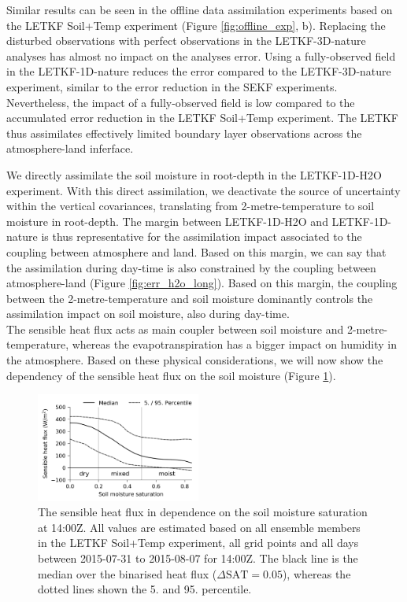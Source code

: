 \documentclass[hess, manuscript]{copernicus}
\begin{document}
Similar results can be seen in the offline data assimilation experiments based on the LETKF Soil+Temp experiment (Figure \ref{fig:offline_exp}, b).
Replacing the disturbed observations with perfect observations in the LETKF-3D-nature analyses has almost no impact on the analyses error.
Using a fully-observed field in the LETKF-1D-nature reduces the error compared to the LETKF-3D-nature experiment, similar to the error reduction in the SEKF experiments.
Nevertheless, the impact of a fully-observed field is low compared to the accumulated error reduction in the LETKF Soil+Temp experiment.
The LETKF thus assimilates effectively limited boundary layer observations across the atmosphere-land inferface.

We directly assimilate the soil moisture in root-depth in the LETKF-1D-H2O experiment.
With this direct assimilation, we deactivate the source of uncertainty within the vertical covariances, translating from 2-metre-temperature to soil moisture in root-depth.
The margin between LETKF-1D-H2O and LETKF-1D-nature is thus representative for the assimilation impact associated to the coupling between atmosphere and land.
Based on this margin, we can say that the assimilation during day-time is also constrained by the coupling between atmosphere-land (Figure \ref{fig:err_h2o_long}).
Based on this margin, the coupling between the 2-metre-temperature and soil moisture dominantly controls the assimilation impact on soil moisture, also during day-time.\\

The sensible heat flux acts as main coupler between soil moisture and 2-metre-temperature, whereas the evapotranspiration has a bigger impact on humidity in the atmosphere.
Based on these physical considerations, we will now show the dependency of the sensible heat flux on the soil moisture (Figure \ref{fig:sensible_smi}).

\begin{figure}[ht]
	\includegraphics[width=0.48\textwidth]{figures/fig_08_sensible_sat.png}
	\caption{
		The sensible heat flux in dependence on the soil moisture saturation at 14:00Z.
		All values are estimated based on all ensemble members in the LETKF Soil+Temp experiment, all grid points and all days between 2015-07-31 to 2015-08-07 for 14:00Z.
		The black line is the median over the binarised heat flux ($\Delta\text{SAT} = 0.05$), whereas the dotted lines shown the 5. and 95. percentile.
	}
	\label{fig:sensible_smi}
\end{figure}
\end{document}
